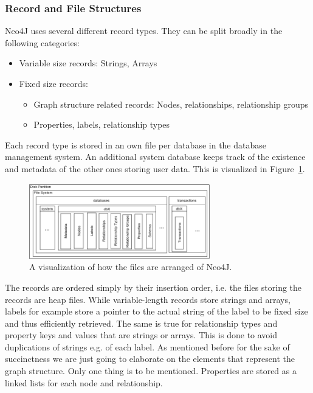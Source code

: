         \subsubsection*{Record and File Structures}\label{n4j-struct}
        Neo4J uses several different record types. They can be split broadly in the following categories:
        \begin{itemize}
         \item Variable size records: Strings, Arrays
         \item Fixed size records:
         \begin{itemize}
          \item Graph structure related records: Nodes, relationships, relationship groups
          \item Properties, labels, relationship types
         \end{itemize}
        \end{itemize}
        
        Each record type is stored in an own file per database in the database management system.
        An additional system database keeps track of the existence and metadata of the other ones storing user data.
        This is visualized in Figure~\ref{n4j-disk}.
        \begin{figure}[htp]
            \begin{center}
                \includegraphics[keepaspectratio,height=0.4\textheight,width=0.7\textwidth]{img/04-databases/N4J_disk_view.png}
            \end{center}
            \caption{A visualization of how the files are arranged of Neo4J.}
            \label{n4j-disk}
        \end{figure}
        
        The records are ordered simply by their insertion order, i.e. the files storing the records are heap files.
        While variable-length records store strings and arrays, labels for example store a pointer to the actual string of the label to be fixed size and thus efficiently retrieved.
        The same is true for relationship types and property keys and values that are strings or arrays.
        This is done to avoid duplications of strings e.g. of each label.
        As mentioned before for the sake of succinctness we are just going to elaborate on the elements that represent the graph structure. 
        Only one thing is to be mentioned.
        Properties are stored as a linked lists for each node and relationship.
        
